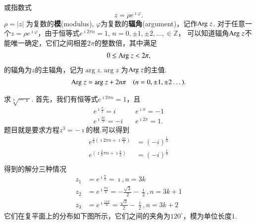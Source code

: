 或指数式
\begin{equation}
    z = \rho e^{\imath \varphi} .
\end{equation}
$\rho = |z|$ 为复数的{\bf 模}(modulus), $\varphi$为复数的{\bf 辐角}(argument)，记作${\mathrm{Arg}\;} z$.
对于任意一个$z=\rho e^{\imath \varphi}$，由于恒等式$e^{\imath 2\pi n} = 1$, $n = 0, \pm 1, \pm 2, \dots, \in \mathbb{Z}$，
可以知道辐角${\mathrm{Arg}\;} z$不能唯一确定，它们之间相差$2\pi$的整数倍，其中满足
\begin{align}
    0 \leq {\mathrm{Arg}\;} z < 2\pi ,
\end{align}
的辐角为$z$的主辐角，记为$\arg z$.$\arg z$ 为${\mathrm{Arg}\;} z$的主值.
\begin{align}
    {\mathrm{Arg}\;} z = {\mathrm{arg}\;} z + 2 n \pi \quad (n = 0, \pm 1, \pm 2\dots).
\end{align}


\begin{examplebox}{求$\sqrt[3]{-\imath}$.}
    首先，我们有恒等式$e^{\imath 2\pi n} = 1$，且
    \begin{align*}
        e^{\imath \frac{\pi}{2}}  = i & \quad  e^{\imath \pi}  =-1 \\
        e^{\imath \frac{3\pi}{2}} = -i & \quad e^{\imath 2\pi} = 1.
    \end{align*}
题目就是要求方程$z^3 =-\imath$的根.可以得到
    \begin{align*}
        e^{\frac{1}{3}(\imath 2\pi n + \imath \frac{3\pi}{2})} & = (-i)^{\frac{1}{3}} \\
        e^{(\imath \frac{2}{3}\pi n + \imath \frac{\pi}{2})}   & =  (-i)^{\frac{1}{3}} \\
    \end{align*}
得到的解分三种情况
    \begin{align*}
        z_1 &=e^{\imath \frac{\pi}{2}} = \imath , n = 3k \\
        z_2 &=e^{\imath \frac{7\pi}{6}} = -\frac{\sqrt{3}}{2} - \frac{\imath}{2} , n = 3k +1 \\
        z_3 &=e^{\imath \frac{11\pi}{6}} = \frac{\sqrt{3}}{2} - \frac{\imath}{2} , n = 3k +2 
    \end{align*}
它们在复平面上的分布如下图所示，它们之间的夹角为$120^\circ$，模为单位长度$1$.
        \centering 
        
\end{examplebox}

